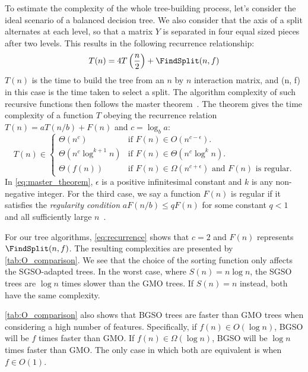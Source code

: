 To estimate the complexity of the whole tree-building process, let's consider the ideal scenario of a balanced decision tree.
We also consider that the axis of a split alternates at each level, so that a matrix $Y$ is separated in four equal sized pieces after two levels. This results in the following recurrence relationship:
%
\begin{equation}
    T(n) = 4T\left(\frac{n}{2}\right) + \FindSplit(n, f)
    \label{eq:recurrence}
\end{equation}
%
$T(n)$ is the time to build the tree from an $n$ by $n$ interaction matrix, and \FindSplit(n, f) in this case is the time taken to select a split.
The algorithm complexity of such recursive functions then follows the master theorem~\cite{cormen2022introduction}. The theorem gives the time complexity of a function $T$ obeying the recurrence relation $T(n) = aT(n/b) + F(n)$ and $c=\log_b a$:
%
\begin{equation}
    T(n) \in \begin{cases}
        \Theta(n^c) & \text{if } F(n) \in O(n^{c-\epsilon}). \\
        \Theta(n^c \log^{k+1} n) & \text{if } F(n) \in \Theta(n^c \log^k n).\\
        \Theta(f(n)) & \text{if } F(n) \in \Omega(n^{c+\epsilon})
            \text{ and }F(n)\text{ is regular.}
    \end{cases}
    \label{eq:master_theorem}
\end{equation}
%
In \autoref{eq:master_theorem}, $\epsilon$ is a positive infinitesimal constant and $k$ is any non-negative integer. For the third case, we say a function $F(n)$ is regular if it satisfies the \emph{regularity condition} $aF(n/b) \leq qF(n)$ for some constant $q < 1$ and all sufficiently large $n$~\cite{cormen2022introduction}.
 
For our tree algorithms, \autoref{eq:recurrence} shows that $c=2$ and $F(n)$ represents $\FindSplit(n, f)$.
The resulting complexities are presented by \autoref{tab:O_comparison}. We see that the choice of the sorting function only affects the SGSO-adapted trees. In the worst case, where $S(n) = n \log n$, the SGSO trees are $\log n$ times slower than the GMO trees. If $S(n) = n$ instead, both have the same complexity.

\autoref{tab:O_comparison} also shows that BGSO trees are faster than GMO trees when considering a high number of features. Specifically, if $f(n) \in O(\log n)$, BGSO will be $f$ times faster than GMO. If $f(n) \in \Omega(\log n)$, BGSO will be $\log n$ times faster than GMO. The only case in which both are equivalent is when $f \in O(1)$.

